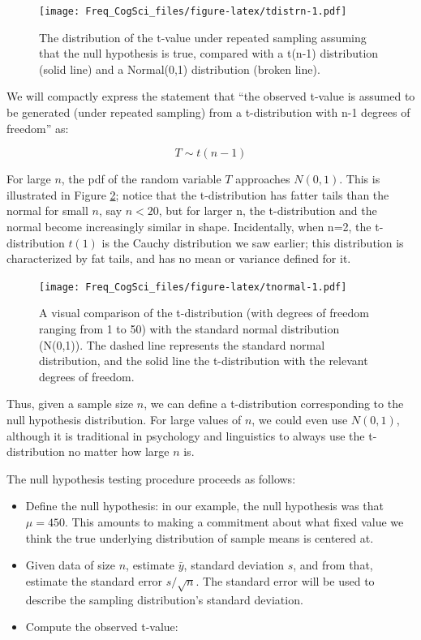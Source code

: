 \documentclass[
  12pt,
]{krantz}
\providecommand{\tightlist}{%
  \setlength{\itemsep}{0pt}\setlength{\parskip}{0pt}}
\theoremstyle{definition}
\theoremstyle{definition}
\theoremstyle{definition}
\theoremstyle{definition}
\theoremstyle{remark}
\begin{document}
\begin{figure}
\centering
\texttt{[image: Freq\_CogSci\_files/figure-latex/tdistrn-1.pdf]}
\caption{\label{fig:tdistrn}The distribution of the t-value under repeated sampling assuming that the null hypothesis is true, compared with a t(n-1) distribution (solid line) and a Normal(0,1) distribution (broken line).}
\end{figure}

We will compactly express the statement that ``the observed t-value is assumed to be generated (under repeated sampling) from a t-distribution with n-1 degrees of freedom'' as:

\begin{equation}
T \sim t(n-1)
\end{equation}

For large \(n\), the pdf of the random variable \(T\) approaches \(N(0,1)\). This is illustrated in Figure \ref{fig:tnormal}; notice that the t-distribution has fatter tails than the normal for small \(n\), say \(n<20\), but for larger n, the t-distribution and the normal become increasingly similar in shape. Incidentally, when n=2, the t-distribution \(t(1)\) is the Cauchy distribution we saw earlier; this distribution is characterized by fat tails, and has no mean or variance defined for it.

\begin{figure}
\centering
\texttt{[image: Freq\_CogSci\_files/figure-latex/tnormal-1.pdf]}
\caption{\label{fig:tnormal}A visual comparison of the t-distribution (with degrees of freedom ranging from 1 to 50) with the standard normal distribution (N(0,1)). The dashed line represents the standard normal distribution, and the solid line the t-distribution with the relevant degrees of freedom.}
\end{figure}

Thus, given a sample size \(n\), we can define a t-distribution corresponding to the null hypothesis distribution. For large values of \(n\), we could even use \(N(0,1)\), although it is traditional in psychology and linguistics to always use the t-distribution no matter how large \(n\) is.

The null hypothesis testing procedure proceeds as follows:

\begin{itemize}
\tightlist
\item
  Define the null hypothesis: in our example, the null hypothesis was that \(\mu = 450\). This amounts to making a commitment about what fixed value we think the true underlying distribution of sample means is centered at.
\item
  Given data of size \(n\), estimate \(\bar{y}\), standard deviation \(s\), and from that, estimate the standard error \(s/\sqrt{n}\). The standard error will be used to describe the sampling distribution's standard deviation.
\item
  Compute the observed t-value:
\end{itemize}
\end{document}
